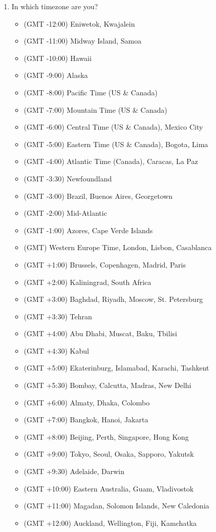 \documentclass[sigconf]{acmart}
\newcommand{\QO}{$\Box$}%
\newenvironment{Qlist}{%
\renewcommand{\labelitemi}{\QO}
\begin{itemize}[leftmargin=1.5em,topsep=-.5em]
}{%
\end{itemize}
}
\begin{document}
\begin{appendix}
\begin{enumerate}
	\item In which timezone are you?
		\begin{Qlist}
			\item (GMT -12:00) Eniwetok, Kwajalein
			\item (GMT -11:00) Midway Island, Samoa
			\item (GMT -10:00) Hawaii
			\item (GMT -9:00) Alaska
			\item (GMT -8:00) Pacific Time (US \& Canada)
			\item (GMT -7:00) Mountain Time (US \& Canada)
			\item (GMT -6:00) Central Time (US \& Canada), Mexico City
			\item (GMT -5:00) Eastern Time (US \& Canada), Bogota, Lima
			\item (GMT -4:00) Atlantic Time (Canada), Caracas, La Paz
			\item (GMT -3:30) Newfoundland
			\item (GMT -3:00) Brazil, Buenos Aires, Georgetown
			\item (GMT -2:00) Mid-Atlantic
			\item (GMT -1:00) Azores, Cape Verde Islands
			\item (GMT) Western Europe Time, London, Lisbon, Casablanca
			\item (GMT +1:00) Brussels, Copenhagen, Madrid, Paris
			\item (GMT +2:00) Kaliningrad, South Africa
			\item (GMT +3:00) Baghdad, Riyadh, Moscow, St. Petersburg
			\item (GMT +3:30) Tehran
			\item (GMT +4:00) Abu Dhabi, Muscat, Baku, Tbilisi
			\item (GMT +4:30) Kabul
			\item (GMT +5:00) Ekaterinburg, Islamabad, Karachi, Tashkent
			\item (GMT +5:30) Bombay, Calcutta, Madras, New Delhi
			\item (GMT +6:00) Almaty, Dhaka, Colombo
			\item (GMT +7:00) Bangkok, Hanoi, Jakarta
			\item (GMT +8:00) Beijing, Perth, Singapore, Hong Kong
			\item (GMT +9:00) Tokyo, Seoul, Osaka, Sapporo, Yakutsk
			\item (GMT +9:30) Adelaide, Darwin
			\item (GMT +10:00) Eastern Australia, Guam, Vladivostok
			\item (GMT +11:00) Magadan, Solomon Islands, New Caledonia
			\item (GMT +12:00) Auckland, Wellington, Fiji, Kamchatka
		\end{Qlist}


\end{enumerate}
\end{appendix}
\end{document}
